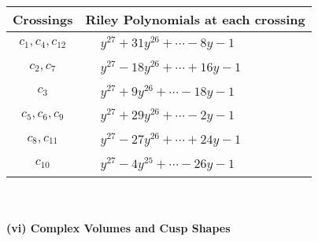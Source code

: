 \documentclass[1p]{elsarticle_modified}
\theoremstyle{definition}
\begin{document}
\begin{tabular}{m{50pt}|m{274pt}}
Crossings & \hspace{64pt}Riley Polynomials at each crossing \\
\hline $$\begin{aligned}c_{1},c_{4},c_{12}\end{aligned}$$&$\begin{aligned}
&y^{27}+31 y^{26}+\cdots-8 y-1
\end{aligned}$\\
\hline $$\begin{aligned}c_{2},c_{7}\end{aligned}$$&$\begin{aligned}
&y^{27}-18 y^{26}+\cdots+16 y-1
\end{aligned}$\\
\hline $$\begin{aligned}c_{3}\end{aligned}$$&$\begin{aligned}
&y^{27}+9 y^{26}+\cdots-18 y-1
\end{aligned}$\\
\hline $$\begin{aligned}c_{5},c_{6},c_{9}\end{aligned}$$&$\begin{aligned}
&y^{27}+29 y^{26}+\cdots-2 y-1
\end{aligned}$\\
\hline $$\begin{aligned}c_{8},c_{11}\end{aligned}$$&$\begin{aligned}
&y^{27}-27 y^{26}+\cdots+24 y-1
\end{aligned}$\\
\hline $$\begin{aligned}c_{10}\end{aligned}$$&$\begin{aligned}
&y^{27}-4 y^{25}+\cdots-26 y-1
\end{aligned}$\\
\hline
\end{tabular}\\~\\
\newpage\flushleft \textbf{(vi) Complex Volumes and Cusp Shapes}
\end{document}
